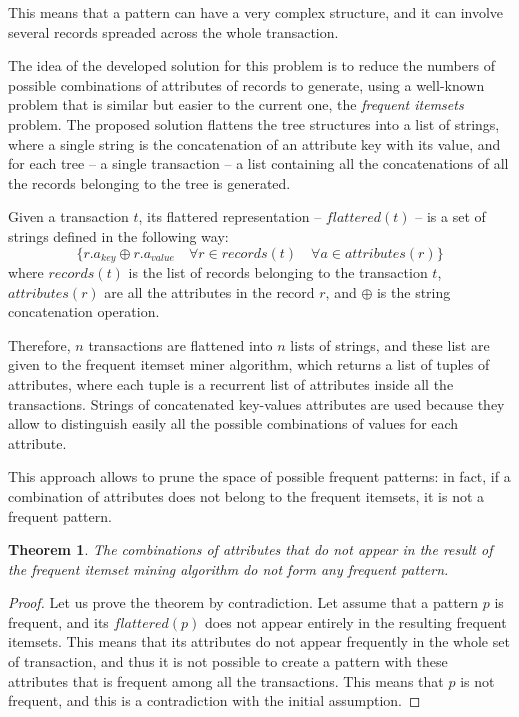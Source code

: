 \documentclass{acm_proc_article-sp-sigmod09}
\begin{document}
This means that a pattern can have a very complex structure, and it can involve several records spreaded across the whole transaction.

The idea of the developed solution for this problem is to reduce the numbers of possible combinations of attributes of records to generate, using a well-known problem that is similar but easier to the current one, the \emph{frequent itemsets} problem. The proposed solution flattens the tree structures into a list of strings, where a single string is the concatenation of an attribute key with its value, and for each tree -- a single transaction -- a list containing all the concatenations of all the records belonging to the tree is generated. 

\begin{definition}
Given a transaction $t$, its flattered representation -- $flattered(t)$ -- is a set of strings defined in the following way:
\[
\{r.a_{key} \oplus r.a_{value} \quad \forall r \in records(t) \quad \forall a \in attributes(r) \}
\]
where $records(t)$ is the list of records belonging to the transaction $t$, $attributes(r)$ are all the attributes in the record $r$, and $\oplus$ is the string concatenation operation.
\end{definition}

Therefore, $n$ transactions are flattened into $n$ lists of strings, and these list are given to the frequent itemset miner algorithm, which returns a list of tuples of attributes, where each tuple is a recurrent list of attributes inside all the transactions. Strings of concatenated key-values attributes are used because they allow to distinguish easily all the possible combinations of values for each attribute.

This approach allows to prune the space of possible frequent patterns: in fact, if a combination of attributes does not belong to the frequent itemsets, it is not a frequent pattern.

\newtheorem{theorem}{Theorem}
\begin{theorem}
The combinations of attributes that do not appear in the result of the frequent itemset mining algorithm do not form any frequent pattern.
\end{theorem}

\begin{proof}
Let us prove the theorem by contradiction. Let assume that a pattern $p$ is frequent, and its $flattered(p)$ does not appear entirely in the resulting frequent itemsets. This means that its attributes do not appear frequently in the whole set of transaction, and thus it is not possible to create a pattern with these attributes that is frequent among all the transactions. This means that $p$ is not frequent, and this is a contradiction with the initial assumption.
\end{proof}
\end{document}
